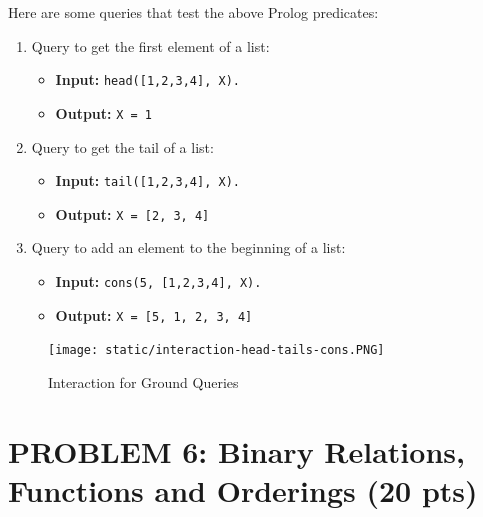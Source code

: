 \documentclass[12pt]{article}
\begin{document}
\begin{spacing}{1.5}
\begin{enumerate}
		      Here are some queries that test the above Prolog predicates:
		      		      		      
		      \begin{enumerate}
		      	\item Query to get the first element of a list:
		      	      \begin{itemize}
		      	      	\item \textbf{Input:} \texttt{head([1,2,3,4], X).}
		      	      	\item \textbf{Output:} \texttt{X = 1} 
		      	      \end{itemize}
		      	      		      	      		      	      
		      	\item Query to get the tail of a list:
		      	      \begin{itemize}
		      	      	\item \textbf{Input:} \texttt{tail([1,2,3,4], X).}
		      	      	\item \textbf{Output:} \texttt{X = [2, 3, 4]} 
		      	      \end{itemize}
		      	      		      	      		      	      
		      	\item Query to add an element to the beginning of a list:
		      	      \begin{itemize}
		      	      	\item \textbf{Input:} \texttt{cons(5, [1,2,3,4], X).}
		      	      	\item \textbf{Output:} \texttt{X = [5, 1, 2, 3, 4]} 
		      	      \end{itemize}
		      \end{enumerate}

            \begin{figure}[htp]
                \centering
                \texttt{[image: static/interaction-head-tails-cons.PNG]}
                \caption{Interaction for Ground Queries}
                \label{fig:figure}
            \end{figure}
		      		      		      		      
	\end{enumerate}
				     
	\newpage
	\section*{PROBLEM 6: Binary Relations, Functions and Orderings (20 pts)}
			

\end{spacing}
\end{document}
